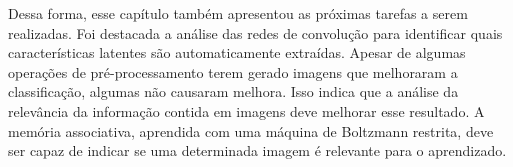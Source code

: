 Dessa forma, esse capítulo também apresentou as próximas tarefas a serem realizadas. Foi destacada a análise das redes de convolução para identificar quais características latentes são automaticamente extraídas. Apesar de algumas operações de pré-processamento terem gerado imagens que melhoraram a classificação, algumas não causaram melhora. Isso indica que a análise da relevância da informação contida em imagens deve melhorar esse resultado. A memória associativa, aprendida com uma máquina de Boltzmann restrita, deve ser capaz de indicar se uma determinada imagem é relevante para o aprendizado.
